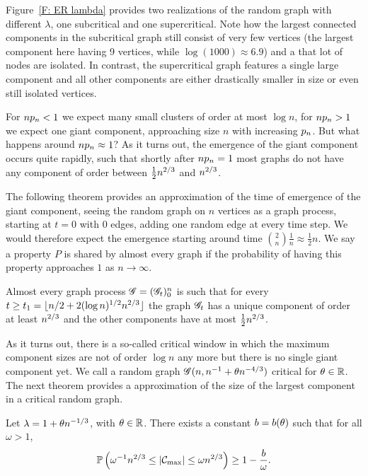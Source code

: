 Figure~\ref{F: ER lambda} provides two realizations of the random graph with different $\lambda$,
one subcritical and one supercritical.
Note how the largest connected components in the subcritical graph still consist of very few vertices
(the largest component here having 9 vertices, while $\log(1000) \approx 6.9$)
and a that lot of nodes are isolated.
In contrast, the supercritical graph features a single large component 
and all other components are either drastically smaller in size or even still isolated vertices.

\bigskip

For $n p_n < 1$ we expect many small clusters of order at most $\log n$,
for $n p_n > 1$ we expect one giant component, approaching size $n$ with increasing $p_n$.
But what happens around $n p_n \approx 1$?
As it turns out, the emergence of the giant component occurs quite rapidly,
such that shortly after $n p_n = 1$ most graphs do not have any component of order between $\frac{1}{2}n^{2 / 3}$ and $n^{2 / 3}$.

The following theorem provides an approximation of the time of emergence of the giant component,
seeing the random graph on $n$ vertices as a graph process,
starting at $t=0$ with $0$ edges, adding one random edge at every time step.
We would therefore expect the emergence starting around time $\binom{2}{n}\frac{1}{n} \approx \frac{1}{2}n$.
We say a property $P$ is shared by almost every graph if the probability of having this property approaches $1$ as $n \rightarrow \infty$.

\begin{theorem}
	Almost every graph process
	$\mathscr{G} = (\mathscr{G}_t)_0^n$ is such that 
	for every $t \geq t_1 = \lfloor n/2 + 2(\log n)^{1/2}n^{2 / 3} \rfloor$ 
	the graph $\mathscr{G}_t$ has a unique component of order at least $n^{2 / 3}$ and the other components have at most $\frac{1}{2}n^{2 / 3}$.
\end{theorem}

As it turns out, there is a so-called critical window in which the maximum component sizes are not of order $\log n$ any more 
but there is no single giant component yet.
We call a random graph $\mathscr{G}(n, n^{-1} + \theta n^{-4 / 3})$ critical for $\theta \in \mathbb{R}$.
The next theorem provides a approximation of the size of the largest component in a critical random graph.

\begin{theorem} \label{T: largest critical cluster}
	Let $\lambda = 1 + \theta n^{-1 / 3}$, with $\theta \in \mathbb{R}$.
	There exists a constant $b = b(\theta)$ such that for all $\omega > 1$,
	\begin{equation}
		\mathbb{P}\left( \omega^{-1} n^{2 / 3} \leq |\mathcal{C}_{\max}| \leq \omega n^{2 / 3}\right) \geq 1 - \frac{b}{\omega}.
	\end{equation}	
\end{theorem}


